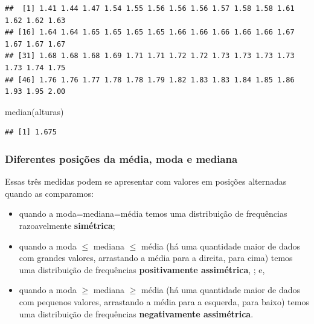 \documentclass[
]{book}
\newenvironment{Shaded}{\begin{snugshade}}{\end{snugshade}}
\newcommand{\FunctionTok}[1]{\textcolor[rgb]{0.00,0.00,0.00}{#1}}
\newcommand{\NormalTok}[1]{#1}
\begin{document}
\begin{verbatim}
##  [1] 1.41 1.44 1.47 1.54 1.55 1.56 1.56 1.56 1.57 1.58 1.58 1.61 1.62 1.62 1.63
## [16] 1.64 1.64 1.65 1.65 1.65 1.65 1.66 1.66 1.66 1.66 1.66 1.67 1.67 1.67 1.67
## [31] 1.68 1.68 1.68 1.69 1.71 1.71 1.72 1.72 1.73 1.73 1.73 1.73 1.73 1.74 1.75
## [46] 1.76 1.76 1.77 1.78 1.78 1.79 1.82 1.83 1.83 1.84 1.85 1.86 1.93 1.95 2.00
\end{verbatim}

\begin{Shaded}
\begin{Highlighting}[]
\FunctionTok{median}\NormalTok{(alturas)}
\end{Highlighting}
\end{Shaded}

\begin{verbatim}
## [1] 1.675
\end{verbatim}

\hypertarget{diferentes-posiuxe7uxf5es-da-muxe9dia-moda-e-mediana}{%
\subsubsection{Diferentes posições da média, moda e mediana}\label{diferentes-posiuxe7uxf5es-da-muxe9dia-moda-e-mediana}}

Essas três medidas podem se apresentar com valores em posições alternadas quando as comparamos:

\begin{itemize}
\item
  quando a moda=mediana=média temos uma distribuição de frequências razoavelmente \textbf{simétrica};
\item
  quando a moda \(\leq\) mediana \(\leq\) média (há uma quantidade maior de dados com grandes valores, arrastando a média para a direita, para cima) temos uma distribuição de frequências \textbf{positivamente assimétrica}, ; e,\\
\item
  quando a moda \(\geq\) mediana \(\geq\) média (há uma quantidade maior de dados com pequenos valores, arrastando a média para a esquerda, para baixo) temos uma distribuição de frequências \textbf{negativamente assimétrica}.
\end{itemize}
\end{document}
